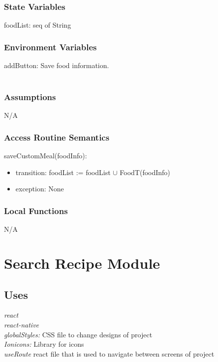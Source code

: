\documentclass[12pt, titlepage]{article}
\begin{document}
\subsubsection{State Variables}
foodList: seq of String\\

\subsubsection{Environment Variables}

addButton: Save food information.\\\\

\subsubsection{Assumptions}

N/A

\subsubsection{Access Routine Semantics}

\noindent saveCustomMeal(foodInfo):
\begin{itemize}
	\item transition: foodList := foodList $ \cup $ FoodT(foodInfo)
	\item exception: None
\end{itemize}

\subsubsection{Local Functions}

N/A

\newpage

\section{Search Recipe Module} \label{Module} 

\subsection{Uses}
{\textit{react}}\\
{\textit{react-native}}\\
{\textit{globalStyles:} CSS file to change designs of project}\\
{\textit{Ionicons:} Library for icons}\\
{\textit{useRoute} react file that is used to navigate between screens of project}\\
\end{document}
